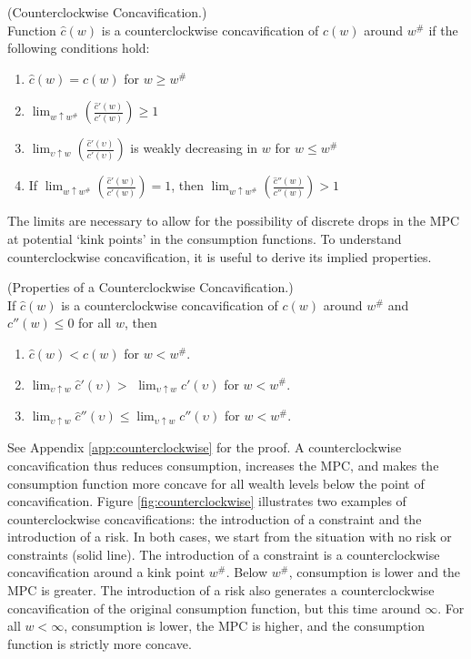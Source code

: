 \begin{defn}\label{defn:cconcavification}(Counterclockwise Concavification.) \\
	Function $\hat{c}(w)$ is a counterclockwise concavification of $c(w)$ around $w^{\#}$ if the following conditions hold:
	\begin{enumerate}
		\item $\hat{c}(w) = c(w)$ for $w \geq w^{\#}$
		\item $\lim_{w \uparrow w^{\#}} \left(\frac{\hat{c}'(w)}{c'(w)}\right)  \geq 1$
		\item $\lim_{\upsilon \uparrow w} \left(\frac{\hat{c}'(\upsilon)}{c'(\upsilon)}\right)$ is weakly decreasing in $w$ for $w \leq w^{\#}$
		\item If $\lim_{w \uparrow w^{\#}} \left(\frac{\hat{c}'(w)}{c'(w)}\right)  = 1$, then $\lim_{w \uparrow w^{\#}} \left(\frac{\hat{c}''(w)}{c''(w)}\right) > 1$
	\end{enumerate}
\end{defn}
The limits are necessary to allow for the possibility of discrete drops in the MPC at potential `kink points' in the consumption functions. To understand counterclockwise concavification, it is useful to derive its implied properties.


\begin{lemma}\label{lem:counterclockwise}(Properties of a Counterclockwise Concavification.) \\
	If $\hat{c}(w)$ is a counterclockwise concavification of $c(w)$ around $w^{\#}$ and $c''(w) \leq 0$ for all $w$, then
	\begin{enumerate}
		\item $\hat{c}(w) < c(w)$ for  $w < w^{\#}$.
		\item $\lim_{\upsilon \uparrow w} \hat{c}'(\upsilon) >$ $\lim_{\upsilon \uparrow w} c'(\upsilon)$ for $w < w^{\#}$.
		\item $\lim_{\upsilon \uparrow w} \hat{c}''(\upsilon) \leq \lim_{\upsilon \uparrow w} c''(\upsilon)$ for $w < w^{\#}$.
	\end{enumerate}
\end{lemma}
See Appendix \ref{app:counterclockwise} for the proof. A counterclockwise concavification thus reduces consumption, increases the MPC, and makes the consumption function more concave for all wealth levels below the point of concavification. Figure \ref{fig:counterclockwise} illustrates two examples of counterclockwise concavifications: the introduction of a constraint and the introduction of a risk. In both cases, we start from the situation with no risk or constraints (solid line). The introduction of a constraint is a counterclockwise concavification around a kink point $w^{\#}$. Below $w^{\#}$, consumption is lower and the MPC is greater. The introduction of a risk also generates a counterclockwise concavification of the original consumption function, but this time around $\infty$. For all $w < \infty$, consumption is lower, the MPC is higher, and the consumption function is strictly more concave.

